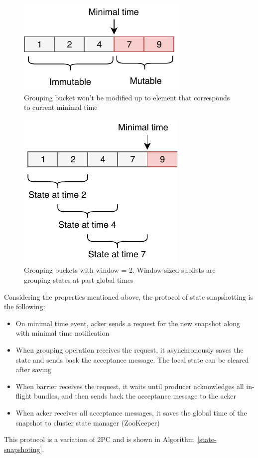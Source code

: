 \begin{figure}[htbp]
  \centering
  \includegraphics[width=.3\textwidth]{pics/immutable}
  \caption{Grouping bucket won't be modified up to element that corresponds to current minimal time}
  \label {immutable}
\end{figure}

\begin{figure}[htbp]
  \centering
  \includegraphics[width=.3\textwidth]{pics/substate}
  \caption{Grouping buckets with window = 2. Window-sized sublists are grouping states at past global times}
  \label {substate}
\end{figure}

Considering the properties mentioned above, the protocol of state snapshotting is the following:

\begin{itemize}
    \item On minimal time event, acker sends a request for the new snapshot along with minimal time notification
    \item When grouping operation receives the request, it asynchronously saves the state and sends back the acceptance message. The local state can be cleared after saving
    \item When barrier receives the request, it waits until producer acknowledges all in-flight bundles, and then sends back the acceptance message to the acker
    \item When acker receives all acceptance messages, it saves the global time of the snapshot to cluster state manager (ZooKeeper) 
\end{itemize}

This protocol is a variation of 2PC and is shown in Algorithm~\ref{state-snapshoting}.

